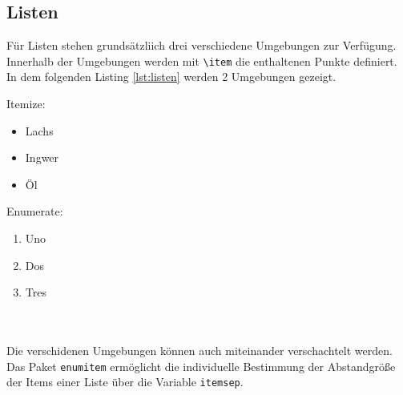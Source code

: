 \subsection{Listen}
Für Listen stehen grundsätzliich drei verschiedene Umgebungen zur Verfügung. Innerhalb der Umgebungen werden mit \texttt{\textbackslash item} die enthaltenen Punkte definiert. In dem folgenden Listing \ref{lst:listen} werden 2 Umgebungen gezeigt.\\
\noindent
\hspace*{\fill}
\begin{minipage}[t]{0.458\linewidth}
\centering
\vspace{0pt}
\end{minipage}
\hfill
\begin{minipage}[t]{0.5\linewidth}
\vspace{32pt}

Itemize: 
\begin{itemize}
    \item Lachs
    \item Ingwer
    \item Öl
\end{itemize}

Enumerate: 
\begin{enumerate}
    \item Uno
    \item Dos
    \item Tres
\end{enumerate}
\clearpage
\end{minipage}\\\\
Die verschidenen Umgebungen können auch miteinander verschachtelt werden. Das Paket \texttt{enumitem} ermöglicht die individuelle Bestimmung der Abstandgröße der Items einer Liste über die Variable \texttt{itemsep}. \cite[vgl.][S.24f]{Lamport1994}


